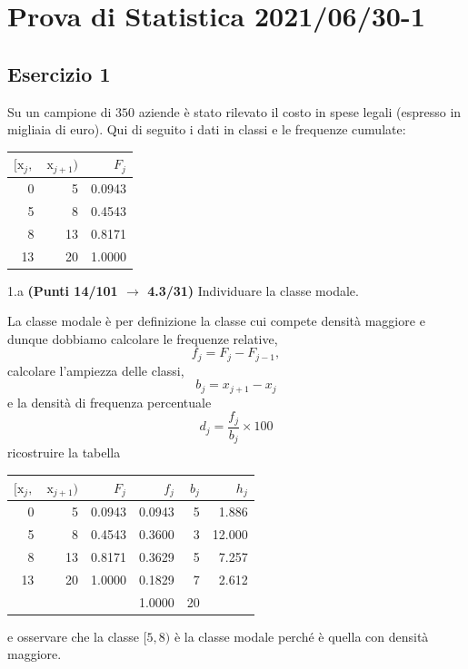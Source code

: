 \documentclass[
  11pt,
]{book}
\theoremstyle{mytheoremstyle}
\theoremstyle{mydefstyle}
\newenvironment{sol}
  {
  \begin{tcolorbox}[enhanced,breakable,arc=0.1mm,boxrule=1pt,colback=white,colframe=iblue,
  title=\bf \fontfamily{lmss}\selectfont \hspace{.5 cm} Soluzione,drop fuzzy shadow]

}{
\end{tcolorbox}
  }
\begin{document}
\section{Prova di Statistica 2021/06/30-1}\label{prova-di-statistica-20210630-1}

\subsection{Esercizio 1}\label{esercizio-1-5}

Su un campione di \(350\) aziende è stato rilevato il costo in spese legali (espresso in migliaia di euro). Qui di seguito i dati in classi e le frequenze cumulate:

\begin{table}[H]
\centering
\begin{tabular}{rrr}
\toprule
$[\text{x}_j,$ & $\text{x}_{j+1})$ & $F_j$\\
\midrule
0 & 5 & 0.0943\\
5 & 8 & 0.4543\\
8 & 13 & 0.8171\\
13 & 20 & 1.0000\\
\bottomrule
\end{tabular}
\end{table}

1.a \textbf{(Punti 14/101 \(\rightarrow\) 4.3/31)} Individuare la classe modale.

\begin{sol}

La classe modale è per definizione la classe cui compete densità maggiore e dunque dobbiamo calcolare
le frequenze relative,
\[
f_j=F_j-F_{j-1},
\]
calcolare l'ampiezza delle classi,
\[
b_j=x_{j+1}-x_{j}
\]
e la densità di frequenza percentuale
\[
d_j=\frac{f_j}{b_j}\times 100
\]
ricostruire la tabella

\begin{table}[H]
\centering
\begin{tabular}{rrrrrr}
\toprule
$[\text{x}_j,$ & $\text{x}_{j+1})$ & $F_j$ & $f_j$ & $b_j$ & $h_j$\\
\midrule
0 & 5 & 0.0943 & 0.0943 & 5 & 1.886\\
5 & 8 & 0.4543 & 0.3600 & 3 & 12.000\\
8 & 13 & 0.8171 & 0.3629 & 5 & 7.257\\
13 & 20 & 1.0000 & 0.1829 & 7 & 2.612\\
 &  &  & 1.0000 & 20 & \\
\bottomrule
\end{tabular}
\end{table}

e osservare che la classe \([5,8)\) è la classe modale perché è quella con densità maggiore.

\end{sol}
\end{document}
